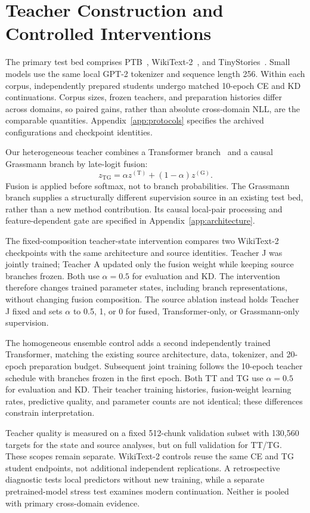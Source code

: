 \section{Teacher Construction and Controlled Interventions}
\label{sec:experimental-setting}

The primary test bed comprises PTB~\citep{marcus1993ptb}, WikiText-2~\citep{merity2016wikitext}, and TinyStories~\citep{eldan2023tinystories}. Small models use the same local GPT-2 tokenizer and sequence length 256. Within each corpus, independently prepared students undergo matched 10-epoch CE and KD continuations. Corpus sizes, frozen teachers, and preparation histories differ across domains, so paired gains, rather than absolute cross-domain NLL, are the comparable quantities. Appendix~\ref{app:protocols} specifies the archived configurations and checkpoint identities.

Our heterogeneous teacher combines a Transformer branch~\citep{vaswani2017attention} and a causal Grassmann branch by late-logit fusion:
\begin{equation}
z_{\mathrm{TG}}=\alpha z^{(\mathrm{T})}+(1-\alpha)z^{(\mathrm{G})}.
\label{eq:teacher-fusion}
\end{equation}
Fusion is applied before softmax, not to branch probabilities. The Grassmann branch supplies a structurally different supervision source in an existing test bed, rather than a new method contribution. Its causal local-pair processing and feature-dependent gate are specified in Appendix~\ref{app:architecture}.

The fixed-composition teacher-state intervention compares two WikiText-2 checkpoints with the same architecture and source identities. Teacher J was jointly trained; Teacher A updated only the fusion weight while keeping source branches frozen. Both use $\alpha=0.5$ for evaluation and KD. The intervention therefore changes trained parameter states, including branch representations, without changing fusion composition. The source ablation instead holds Teacher J fixed and sets $\alpha$ to 0.5, 1, or 0 for fused, Transformer-only, or Grassmann-only supervision.

The homogeneous ensemble control adds a second independently trained Transformer, matching the existing source architecture, data, tokenizer, and 20-epoch preparation budget. Subsequent joint training follows the 10-epoch teacher schedule with branches frozen in the first epoch. Both TT and TG use $\alpha=0.5$ for evaluation and KD. Their teacher training histories, fusion-weight learning rates, predictive quality, and parameter counts are not identical; these differences constrain interpretation.

Teacher quality is measured on a fixed 512-chunk validation subset with 130,560 targets for the state and source analyses, but on full validation for TT/TG. These scopes remain separate. WikiText-2 controls reuse the same CE and TG student endpoints, not additional independent replications. A retrospective diagnostic tests local predictors without new training, while a separate pretrained-model stress test examines modern continuation. Neither is pooled with primary cross-domain evidence.

